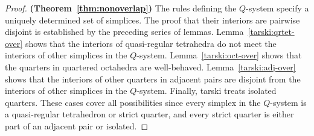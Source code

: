 \begin{proof} {\bf (Theorem~\ref{thm:nonoverlap})}
The rules defining the $Q$-system specify a uniquely determined
set of simplices.  The proof that their interiors are pairwise
disjoint is established by the preceding series of lemmas.
Lemma~\ref{tarski:qrtet-over} shows that the interiors of
quasi-regular tetrahedra do not meet the interiors of other
simplices in the $Q$-system. Lemma~\ref{tarski:oct-over} shows that
the quarters in quartered octahedra are well-behaved.
Lemma~\ref{tarski:adj-over} shows that the interiors of other
quarters in adjacent pairs are disjoint from the interiors of
other simplices in the $Q$-system. Finally, 
tarski treats isolated
quarters. These cases cover all
possibilities since every simplex in the $Q$-system is a
quasi-regular tetrahedron or strict quarter, and every strict
quarter is either part of an adjacent pair or isolated.
\end{proof}







